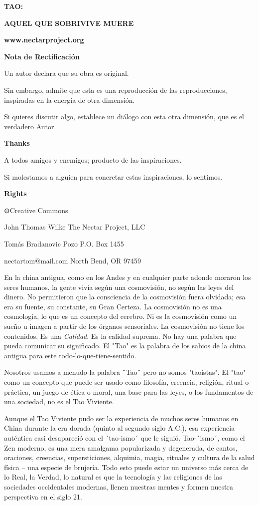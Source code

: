 \textbf{TAO:}

\textbf{AQUEL QUE SOBRIVIVE MUERE}

\textbf{www.nectarproject.org}

\textbf{Nota de Rectificación}

Un autor declara que su obra es original.

Sin embargo, admite que esta es una reproducción de las reproducciones,
inspiradas en la energía de otra dimensión.

Si quieres discutir algo, establece un diálogo con esta otra dimensión,
que es el verdadero Autor.

\textbf{Thanks}

A todos amigos y enemigos; producto de las inspiraciones.

Si molestamos a alguien para concretar estas inspiraciones, lo sentimos.

\textbf{Rights}

⊙Creative Commons

John Thomas Wilke The Nectar Project, LLC

Tomás Bradanovic Pozo P.O. Box 1455

nectartom@mail.com North Bend, OR 97459

En la china antigua, como en los Andes y en cualquier parte adonde
moraron los seres humanos, la gente vivía según una cosmovisión, no
según las leyes del dinero. No permitieron que la consciencia de la
cosmovisión fuera olvidada; esa era su fuente, su constante, su Gran
Certeza. La cosmovisión no es una cosmología, lo que es un concepto del
cerebro. Ni es la cosmovisión como un sueño u imagen a partir de los
órganos sensoriales. La cosmovisión no tiene los contenidos. Es una
\emph{Calidad}. Es la calidad suprema. No hay una palabra que pueda
comunicar su significado. El "Tao" es la palabra de los sabios de la
china antigua para este todo-lo-que-tiene-sentido.

Nosotros usamos a menudo la palabra ¨Tao¨ pero no somos "taoistas". El
"tao" como un concepto que puede ser usado como filosofía, creencia,
religión, ritual o práctica, un juego de ética o moral, una base para
las leyes, o los fundamentos de una sociedad, no es el Tao Viviente.

Aunque el Tao Viviente pudo ser la experiencia de muchos seres humanos
en China durante la era dorada (quinto al segundo siglo A.C.), esa
experiencia auténtica casi desapareció con el ´tao-ismo´ que le siguió.
Tao-´ismo´, como el Zen moderno, es una mera amalgama popularizada y
degenerada, de cantos, oraciones, creencias, supersticiones, alquimia,
magia, rituales y cultura de la salud física -- una especie de brujería.
Todo esto puede estar un universo más cerca de lo Real, la Verdad, lo
natural es que la tecnología y las religiones de las sociedades
occidentales modernas, llenen nuestras mentes y formen nuestra
perspectiva en el siglo 21.

